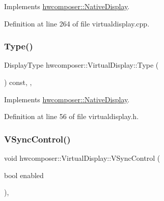 Implements \mbox{\hyperlink{classhwcomposer_1_1NativeDisplay_a9ea847cb1e75677fca7dabbcfb59a26a}{hwcomposer\+::\+Native\+Display}}.



Definition at line 264 of file virtualdisplay.\+cpp.


\begin{DoxyCode}{0}
\end{DoxyCode}
\mbox{\label{classhwcomposer_1_1VirtualDisplay_a20d0dc4afb2b131ffec31e81e046c52d}} 
\subsubsection{\texorpdfstring{Type()}{Type()}}
{\footnotesize\ttfamily Display\+Type hwcomposer\+::\+Virtual\+Display\+::\+Type (\begin{DoxyParamCaption}{ }\end{DoxyParamCaption}) const\hspace{0.3cm}{\ttfamily [inline]}, {\ttfamily [override]}, {\ttfamily [virtual]}}



Implements \mbox{\hyperlink{classhwcomposer_1_1NativeDisplay_a67018275066174f9e5d4b801cd6fea31}{hwcomposer\+::\+Native\+Display}}.



Definition at line 56 of file virtualdisplay.\+h.


\begin{DoxyCode}{0}
\end{DoxyCode}
\mbox{\label{classhwcomposer_1_1VirtualDisplay_a96071f0a9aed7cbacbdae71ed3f46e6b}} 
\subsubsection{\texorpdfstring{V\+Sync\+Control()}{VSyncControl()}}
{\footnotesize\ttfamily void hwcomposer\+::\+Virtual\+Display\+::\+V\+Sync\+Control (\begin{DoxyParamCaption}\item[{bool}]{enabled }\end{DoxyParamCaption})\hspace{0.3cm}{\ttfamily [override]}, {\ttfamily [virtual]}}



